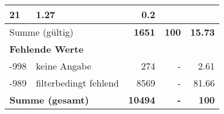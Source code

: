 \begin{longtable}{lXrrr}
       \num{21} &
       \num[round-mode=places,round-precision=2]{1.27} &
         \num[round-mode=places,round-precision=2]{0.2} \\
     \midrule
     \multicolumn{2}{l}{Summe (gültig)} &
       \textbf{\num{1651}} &
     \textbf{\num{100}} &
       \textbf{\num[round-mode=places,round-precision=2]{15.73}} \\
     \multicolumn{5}{l}{\textbf{Fehlende Werte}}\\
       -998 &
       keine Angabe &
         \num{274} &
        - &
         \num[round-mode=places,round-precision=2]{2.61} \\
       -989 &
       filterbedingt fehlend &
         \num{8569} &
        - &
         \num[round-mode=places,round-precision=2]{81.66} \\
     \midrule
     \multicolumn{2}{l}{\textbf{Summe (gesamt)}} &
          \textbf{\num{10494}} &
        \textbf{-} &
        \textbf{\num{100}} \\
     \bottomrule
     \end{longtable}
     
